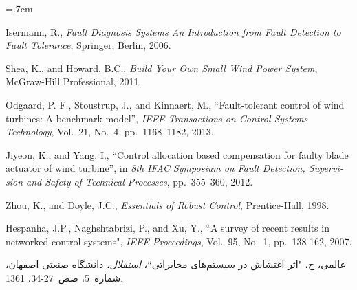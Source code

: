 \renewcommand{\bibname}{مراجع}

\begin{thebibliography}{99}

\begin{latin}

\baselineskip=.7cm

\noindent Isermann, R., \textit{Fault Diagnosis Systems An Introduction from Fault Detection to Fault Tolerance}, Springer, Berlin, 2006.

Shea, K., and Howard, B.C., \textit{Build Your Own Small Wind Power System}, McGraw-Hill Professional, 2011.

Odgaard, P. F., Stoustrup, J., and Kinnaert, M., “Fault-tolerant control of wind turbines: A benchmark model”,  \textit{IEEE Transactions on Control Systems Technology}, Vol.~21, No.~4, pp.~1168–1182, 2013.

Jiyeon, K., and Yang, I., “Control allocation based compensation for faulty blade actuator of wind turbine”, in \textit{8th IFAC Symposium on Fault Detection, Supervision and Safety of Technical Processes}, pp.~355–360, 2012.

Zhou, K., and Doyle, J.C., \textit{Essentials of Robust Control}, Prentice-Hall, 1998.


Hespanha, J.P., Naghshtabrizi, P., and Xu, Y., ``A survey of recent results in networked control systems", \textit{IEEE Proceedings}, Vol.~95, No.~1, pp.~138-162, 2007.

\end{latin}


عالمی، ح، "اثر اغتشاش در سیستم‌های مخابراتی``، \textit{استقلال،} دانشگاه صنعتی اصفهان، شماره~5، صص~27-34، 1361.

\end{thebibliography}